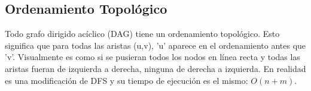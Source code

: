 \documentclass{article}
\begin{document}
\begin{multicols}{2}
	\subsection{Ordenamiento Topológico}
	Todo grafo dirigido acíclico (DAG) tiene un ordenamiento topológico. Esto significa que para todas las aristas (u,v), 'u' aparece en el ordenamiento antes que 'v'. Visualmente es como si se pusieran todos los nodos en línea recta y todas las aristas fueran de izquierda a derecha, ninguna de derecha a izquierda. En realidad es una modificación de DFS y su tiempo de ejecución es el mismo: \( O(n + m) \).
	
\end{multicols}	
\end{document}
